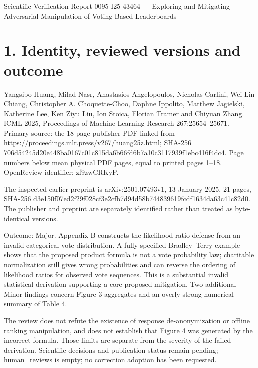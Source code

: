 \documentclass[10pt]{article}
\begin{document}
Scientific Verification Report 0095
I25-43464 — Exploring and Mitigating Adversarial Manipulation of Voting-Based Leaderboards\par
\section*{1. Identity, reviewed versions and outcome}
Yangsibo Huang, Milad Nasr, Anastasios Angelopoulos, Nicholas Carlini, Wei-Lin Chiang, Christopher A. Choquette-Choo, Daphne Ippolito, Matthew Jagielski, Katherine Lee, Ken Ziyu Liu, Ion Stoica, Florian Tramer and Chiyuan Zhang. ICML 2025, Proceedings of Machine Learning Research 267:25654–25671. Primary source: the 18-page publisher PDF linked from https://proceedings.mlr.press/v267/huang25z.html; SHA-256 706d54245d20e448ba0167c01c815da6b66fd6b7a10c3117939f1ebc416f4dc4. Page numbers below mean physical PDF pages, equal to printed pages 1–18. OpenReview identifier: zf9zwCRKyP.\par
The inspected earlier preprint is arXiv:2501.07493v1, 13 January 2025, 21 pages, SHA-256 d3e150f07ed2f29f028cf3e2cfb7d94d58b744839619fcdf1634da63c41c82d0. The publisher and preprint are separately identified rather than treated as byte-identical versions.\par
Outcome: Major. Appendix B constructs the likelihood-ratio defense from an invalid categorical vote distribution. A fully specified Bradley–Terry example shows that the proposed product formula is not a vote probability law; charitable normalization still gives wrong probabilities and can reverse the ordering of likelihood ratios for observed vote sequences. This is a substantial invalid statistical derivation supporting a core proposed mitigation. Two additional Minor findings concern Figure 3 aggregates and an overly strong numerical summary of Table 4.\par
The review does not refute the existence of response de-anonymization or offline ranking manipulation, and does not establish that Figure 4 was generated by the incorrect formula. Those limits are separate from the severity of the failed derivation. Scientific decisions and publication status remain pending; human\_reviews is empty; no correction adoption has been requested.\par
\end{document}
